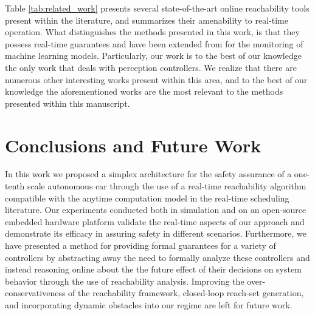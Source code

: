 \documentclass[manuscript,screen,review]{acmart}
\newcommand{\diego}[1]{\textcolor{purple}{\textbf{\underline{DM:}} #1}}
\begin{document}
Table \ref{tab:related_work} presents several state-of-the-art online reachability tools present within the literature, and summarizes their amenability to real-time operation. What distinguishes the methods presented in this work, is that they possess real-time guarantees and have been extended from \cite{Johnson2016} for the monitoring of machine learning models. Particularly, our work is to the best of our knowledge the only work that deals with perception controllers. We realize that there are numerous other interesting works present within this area, and to the best of our knowledge the aforementioned works are the most relevant to the methods presented within this manuscript.   

\section{Conclusions and Future Work}

In this work we proposed a simplex architecture for the safety assurance of a one-tenth scale autonomous car through the use of a real-time reachability algorithm compatible with the anytime computation model in the real-time scheduling literature. Our experiments conducted both in simulation and on an open-source embedded hardware platform validate the real-time aspects of our approach and demonstrate its efficacy in assuring safety in different scenarios. Furthermore, we have presented a method for providing formal guarantees for a variety of controllers by abstracting away the need to formally analyze these controllers and instead reasoning online about the the future effect of their decisions on system behavior through the use of reachability analysis. Improving the over-conservativeness of the reachability framework,  closed-loop reach-set generation, and incorporating dynamic obstacles into our regime are left for future work.


\end{document}

